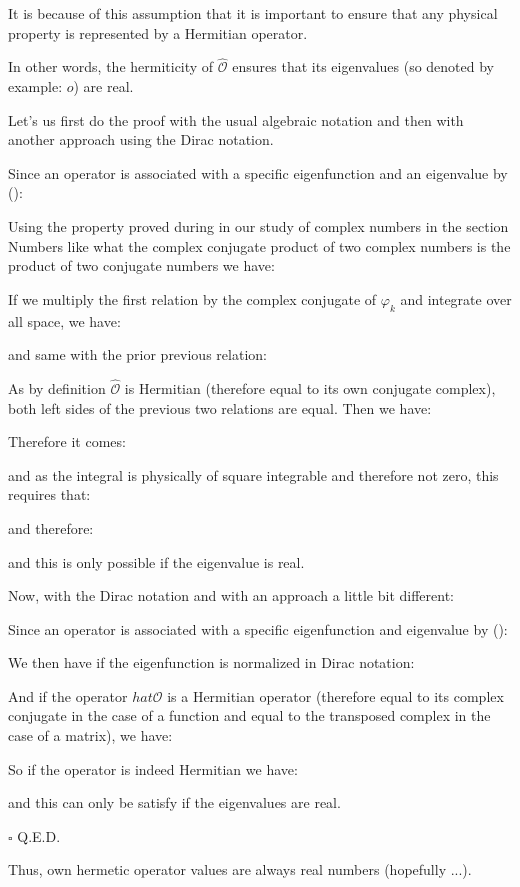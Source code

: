 	It is because of this assumption that it is important to ensure that any physical property is represented by a Hermitian operator. 
	\begin{theorem}
	In other words, the hermiticity of $\hat{\mathcal{O}}$ ensures that its eigenvalues (so denoted by example: $o$) are real.
	
	Let's us first do the proof with the usual algebraic notation and then with another approach using the Dirac notation.
	\end{theorem}
	\begin{dem}
	Since an operator is associated with a specific eigenfunction and an eigenvalue by ():
	
	Using the property proved during in our study of complex numbers in the section Numbers like what the complex conjugate product of two complex numbers is the product of two conjugate numbers we have:
		
	If we multiply the first relation by the complex conjugate of $\varphi_k$ and integrate over all space, we have:
	
	and same with the prior previous relation:
	
	As by definition $\hat{\mathcal{O}}$ is Hermitian (therefore equal to its own conjugate complex), both left sides of the previous two relations are equal. Then we have:
	
	Therefore it comes:
	
	and as the integral is physically of square integrable and therefore not zero, this requires that:
	
	and therefore:
	
	and this is only possible if the eigenvalue is real.
	
	Now, with the Dirac notation and with an approach a little bit different:
	
	Since an operator is associated with a specific eigenfunction and eigenvalue by ():
	
	We then have if the eigenfunction is normalized in Dirac notation:
	
	And if the operator $hat{\mathcal{O}}$ is a Hermitian operator (therefore equal to its complex conjugate in the case of a function and equal to the transposed complex in the case of a matrix), we have:
	
	So if the operator is indeed Hermitian we have:
	
	and this can only be satisfy if the eigenvalues are real.
	\begin{flushright}
		$\square$  Q.E.D.
	\end{flushright}
	\end{dem}
	Thus, own hermetic operator values are always real numbers (hopefully ...).
	
